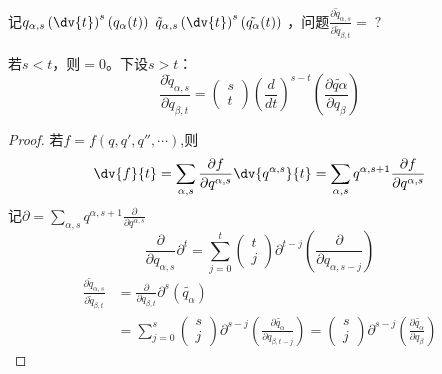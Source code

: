 \documentclass[12pt, a4paper, oneside, UTF8]{ctexbook}  %
\newcommand{\pa}{\partial}
\begin{document}
\begin{proposition}
    记\(q_{\alpha,s}\left(\dv{t}\right)^s\left(q_\alpha(t)\right)\)
    \(\tilde{q}_{\alpha,s}\left(\dv{t}\right)^s\left(\tilde{q_\alpha}(t)\right)\)
    ，问题\(\displaystyle
        \frac{\pa \tilde{q}_{\alpha,s}}{\pa \tilde{q}_{\beta,t}}=\;?\qquad
\)

若\(s<t\)，则\(=0\)。下设\(s>t\)：
\[
\frac{\partial\tilde{q}_{\alpha, s}}{\partial q_{\beta,t}}=
\begin{pmatrix}
s \\
t
\end{pmatrix}
\left(\frac{d}{dt}\right)^{s-t}
\left(\frac{\partial\tilde{q\alpha}}{\partial q_\beta}\right)
\]
\begin{proof}
若\(f=f(q,q',q'',\cdots)\),则
\[
\dv{f}{t}=\sum_{\alpha,s}\frac{\pa f}{\pa q^{\alpha,s}}\dv{q^{\alpha,s}}{t}
=\sum_{\alpha,s}q^{\alpha,s+1}\frac{\pa f}{\pa q^{\alpha,s}}
\]
记\(\pa =\sum_{\alpha,s}q^{\alpha,s+1}\frac{\pa }{\pa q^{\alpha,s}}\)
\[
    \frac{\partial}{\partial q_{\alpha,s}}\pa^t=
    \sum_{j=0}^{t}
    \begin{pmatrix}
    t\\
    j
    \end{pmatrix}
    \pa^{t-j}
    \left(\frac{\partial}{\partial q_{\alpha,s-j}}\right)
\]
\begin{align*}
    \frac{\pa \tilde{q}_{\alpha,s}}{\pa \tilde{q}_{\beta,t}}
    &=\frac{\pa }{\pa q_{\beta,t}}\pa ^s(\tilde{q_\alpha})\\
    &=\sum_{j=0}^{s}
    \begin{pmatrix}
    s\\
    j
    \end{pmatrix}
    \pa^{s-j}
    \left(\frac{\partial \tilde{q_\alpha}}{\partial q_{\beta,t-j}}\right)
    =\begin{pmatrix}
        s\\
        j
        \end{pmatrix}
        \pa^{s-j}
        \left(\frac{\partial \tilde{q_\alpha}}{\partial q_\beta}\right)    
\end{align*}
\end{proof}
\end{proposition}
\end{document}
